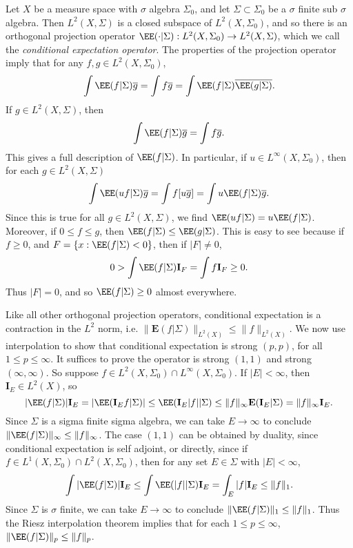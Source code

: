 \begin{example}
Let $X$ be a measure space with $\sigma$ algebra $\Sigma_0$, and let $\Sigma \subset \Sigma_0$ be a $\sigma$ finite sub $\sigma$ algebra. Then $L^2(X,\Sigma)$ is a closed subspace of $L^2(X,\Sigma_0)$, and so there is an orthogonal projection operator $\EE(\cdot|\Sigma): L^2(X,\Sigma_0) \to L^2(X,\Sigma)$, which we call the \emph{conditional expectation operator}. The properties of the projection operator imply that for any $f,g \in L^2(X, \Sigma_0)$,
%
\[ \int \EE(f|\Sigma) \overline{g} = \int f \overline{g} = \int \EE(f|\Sigma) \overline{\EE(g|\Sigma)}. \]
%
If $g \in L^2(X,\Sigma)$, then
%
\[ \int \EE(f|\Sigma) \overline{g} = \int f \overline{g}. \]
%
This gives a full description of $\EE(f|\Sigma)$. In particular, if $u \in L^\infty(X,\Sigma_0)$, then for each $g \in L^2(X,\Sigma)$
%
\[ \int \EE(uf|\Sigma) \overline{g} = \int f [u\overline{g}] = \int u \EE(f|\Sigma) \overline{g}. \]
%
Since this is true for all $g \in L^2(X,\Sigma)$, we find $\EE(uf|\Sigma) = u \EE(f|\Sigma)$. Moreover, if $0 \leq f \leq g$, then $\EE(f|\Sigma) \leq \EE(g|\Sigma)$. This is easy to see because if $f \geq 0$, and $F = \{ x : \EE(f|\Sigma) < 0 \}$, then if $|F| \neq 0$,
%
\[ 0 > \int \EE(f|\Sigma) \mathbf{I}_F = \int f \mathbf{I}_F \geq 0. \]
%
Thus $|F| = 0$, and so $\EE(f|\Sigma) \geq 0$ almost everywhere.

Like all other orthogonal projection operators, conditional expectation is a contraction in the $L^2$ norm, i.e. $\| \mathbf{E}(f|\Sigma) \|_{L^2(X)} \leq \| f \|_{L^2(X)}$. We now use interpolation to show that conditional expectation is strong $(p,p)$, for all $1 \leq p \leq \infty$. It suffices to prove the operator is strong $(1,1)$ and strong $(\infty,\infty)$. So suppose $f \in L^2(X,\Sigma_0) \cap L^\infty(X,\Sigma_0)$. If $|E| < \infty$, then $\mathbf{I}_E \in L^2(X)$, so
%
\[ |\EE(f|\Sigma)| \mathbf{I}_E = |\EE(\mathbf{I}_E f | \Sigma)| \leq \EE(\mathbf{I}_E |f| | \Sigma) \leq \| f \|_\infty \mathbf{E}(\mathbf{I}_E|\Sigma) = \| f \|_\infty \mathbf{I}_E. \]
%
Since $\Sigma$ is a sigma finite sigma algebra, we can take $E \to \infty$ to conclude $\| \EE(f|\Sigma) \|_\infty \leq \| f \|_\infty$. The case $(1,1)$ can be obtained by duality, since conditional expectation is self adjoint, or directly, since if $f \in L^1(X,\Sigma_0) \cap L^2(X,\Sigma_0)$, then for any set $E \in \Sigma$ with $|E| < \infty$,
%
\[ \int |\EE(f|\Sigma)| \mathbf{I}_E \leq \int \EE(|f||\Sigma) \mathbf{I}_E = \int_E |f| \mathbf{I}_E \leq \| f \|_1. \]
%
Since $\Sigma$ is $\sigma$ finite, we can take $E \to \infty$ to conclude $\| \EE(f|\Sigma) \|_1 \leq \| f \|_1$. Thus the Riesz interpolation theorem implies that for each $1 \leq p \leq \infty$, $\| \EE(f|\Sigma) \|_p \leq \| f \|_p$.


\end{example}
